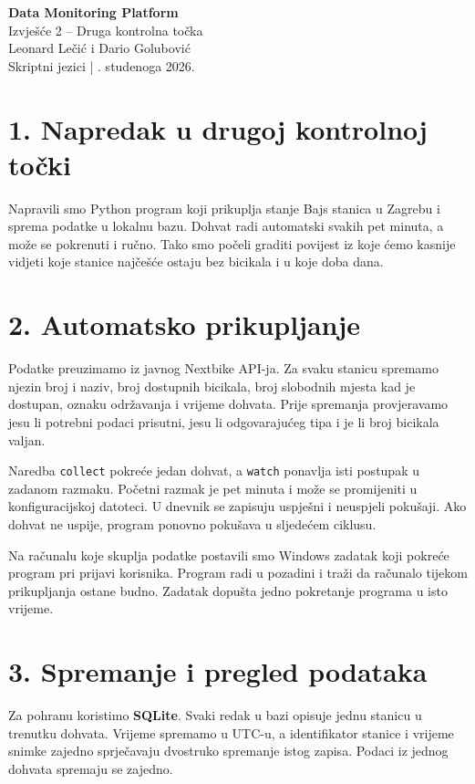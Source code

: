 \documentclass[a4paper,11pt]{article}
\begin{document}
\begin{center}
{\Large\bfseries Data Monitoring Platform}\\[5pt]
{\large Izvješće 2 -- Druga kontrolna točka}\\[7pt]
Leonard Lečić i Dario Golubović\\
Skriptni jezici \quad | . studenoga 2026.
\end{center}



\section*{1. Napredak u drugoj kontrolnoj točki}
Napravili smo Python program koji prikuplja stanje Bajs stanica u
Zagrebu i sprema podatke u lokalnu bazu. Dohvat radi automatski
svakih pet minuta, a može se pokrenuti i ručno. Tako smo počeli
graditi povijest iz koje ćemo kasnije vidjeti koje stanice najčešće
ostaju bez bicikala i u koje doba dana.

\section*{2. Automatsko prikupljanje}
Podatke preuzimamo iz javnog Nextbike API-ja. Za svaku stanicu
spremamo njezin broj i naziv, broj dostupnih bicikala, broj slobodnih
mjesta kad je dostupan, oznaku održavanja i vrijeme dohvata.
Prije spremanja provjeravamo jesu li potrebni podaci prisutni,
jesu li odgovarajućeg tipa i je li broj bicikala valjan.

Naredba \texttt{collect} pokreće jedan dohvat, a \texttt{watch}
ponavlja isti postupak u zadanom razmaku. Početni razmak je pet
minuta i može se promijeniti u konfiguracijskoj datoteci.
U dnevnik se zapisuju uspješni i neuspjeli pokušaji. Ako dohvat
ne uspije, program ponovno pokušava u sljedećem ciklusu.

Na računalu koje skuplja podatke postavili smo Windows zadatak
koji pokreće program pri prijavi korisnika. Program radi u pozadini
i traži da računalo tijekom prikupljanja ostane budno.
Zadatak dopušta jedno pokretanje programa u isto vrijeme.

\section*{3. Spremanje i pregled podataka}
Za pohranu koristimo \textbf{SQLite}. Svaki redak u bazi opisuje
jednu stanicu u trenutku dohvata. Vrijeme spremamo u UTC-u, a
identifikator stanice i vrijeme snimke zajedno sprječavaju
dvostruko spremanje istog zapisa. Podaci iz jednog dohvata
spremaju se zajedno.
\end{document}
